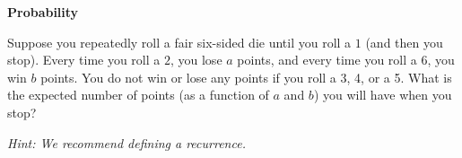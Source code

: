 \item {} {\bf Probability}

Suppose you repeatedly roll a fair six-sided die until you roll a $1$ (and then
you stop). Every time you roll a $2$, you lose $a$ points, and every time you
roll a 6, you win $b$ points. You do not win or lose any points if you roll a 3,
4, or a 5. What is the expected number of points (as a function of $a$ and $b$)
you will have when you stop?

{\em Hint: We recommend defining a recurrence.}
